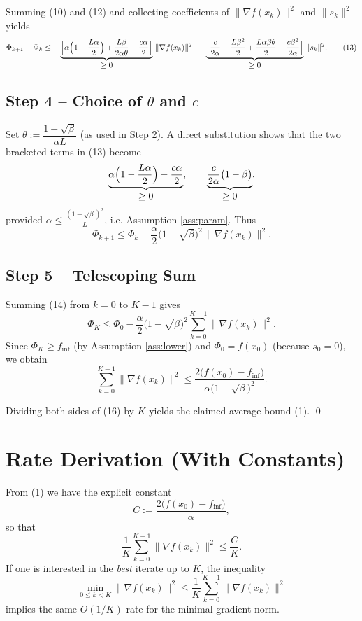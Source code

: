 \documentclass{article}
\begin{document}
Summing (10) and (12) and collecting coefficients of $\|\nabla f(x_{k})\|^{2}$ and $\|s_{k}\|^{2}$ yields
\[
\Phi_{k+1}-\Phi_{k}
\le -\underbrace{\Bigl[\alpha\Bigl(1-\frac{L\alpha}{2}\Bigr)+\frac{L\beta}{2\alpha\theta}
-\frac{c\alpha}{2}\Bigr]}_{\displaystyle\ge 0}\,\|\nabla f(x_{k})\|^{2}
\;-\;
\underbrace{\Bigl[\frac{c}{2\alpha}-\frac{L\beta^{2}}{2}
+\frac{L\alpha\beta\theta}{2}
-\frac{c\beta^{2}}{2\alpha}\Bigr]}_{\displaystyle\ge 0}\,\|s_{k}\|^{2}.
\tag{13}
\]

\subsection*{Step 4 – Choice of $\theta$ and $c$}
Set $\theta:=\dfrac{1-\sqrt{\beta}}{\alpha L}$ (as used in Step 2).  
A direct substitution shows that the two bracketed terms in (13) become
\[
\underbrace{\alpha\Bigl(1-\frac{L\alpha}{2}\Bigr)-\frac{c\alpha}{2}}_{\displaystyle\ge 0},
\qquad
\underbrace{\frac{c}{2\alpha}\bigl(1-\beta\bigr)}_{\displaystyle\ge 0},
\]
provided $\alpha\le\frac{(1-\sqrt{\beta})^{2}}{L}$, i.e. Assumption \ref{ass:param}. Thus
\[
\Phi_{k+1}\le \Phi_{k}
-\frac{\alpha}{2}\bigl(1-\sqrt{\beta}\bigr)^{2}\,\|\nabla f(x_{k})\|^{2}. \tag{14}
\]

\subsection*{Step 5 – Telescoping Sum}
Summing (14) from $k=0$ to $K-1$ gives
\[
\Phi_{K}\le \Phi_{0}
-\frac{\alpha}{2}\bigl(1-\sqrt{\beta}\bigr)^{2}\sum_{k=0}^{K-1}\|\nabla f(x_{k})\|^{2}.
\tag{15}
\]
Since $\Phi_{K}\ge f_{\inf}$ (by Assumption \ref{ass:lower}) and $\Phi_{0}=f(x_{0})$ (because $s_{0}=0$), we obtain
\[
\sum_{k=0}^{K-1}\|\nabla f(x_{k})\|^{2}
\le
\frac{2\bigl(f(x_{0})-f_{\inf}\bigr)}{\alpha\bigl(1-\sqrt{\beta}\bigr)^{2}}.
\tag{16}
\]

Dividing both sides of (16) by $K$ yields the claimed average bound (1). \qed

\section*{Rate Derivation (With Constants)}
From (1) we have the explicit constant
\[
C:=\frac{2\bigl(f(x_{0})-f_{\inf}\bigr)}{\alpha},
\]
so that
\[
\frac{1}{K}\sum_{k=0}^{K-1}\|\nabla f(x_{k})\|^{2}\le \frac{C}{K}.
\]
If one is interested in the \emph{best} iterate up to $K$, the inequality
\[
\min_{0\le k<K}\|\nabla f(x_{k})\|^{2}
\le \frac{1}{K}\sum_{k=0}^{K-1}\|\nabla f(x_{k})\|^{2}
\]
implies the same $O(1/K)$ rate for the minimal gradient norm.
\end{document}
